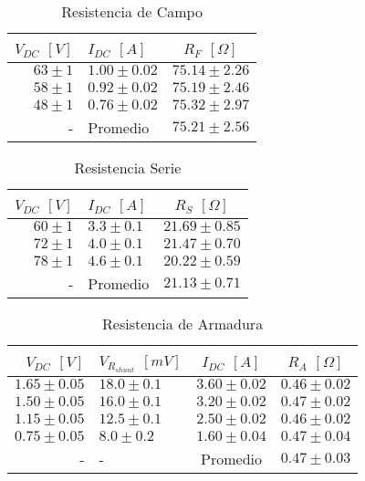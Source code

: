 \documentclass[11pt,letterpaper]{article}
\begin{document}
\begin{table}[t]
	\begin{center}
		\begin{tabular}{| r | l | c |}
			\hline
			$V_{DC}$ $[V]$ & $I_{DC}$ $[A]$ & $R_{F}$ $[\Omega]$ \\ \hline
			$63 \pm 1$ & $1.00 \pm 0.02$ & $75.14 \pm 2.26 $ \\
			$58 \pm 1$ & $0.92 \pm 0.02$ & $75.19 \pm 2.46$ \\
			$48 \pm 1$ & $0.76 \pm 0.02$ & $75.32 \pm 2.97$ \\ \hline
			- & Promedio & $75.21 \pm 2.56$ \\ \hline
		\end{tabular}
		\caption{Resistencia de Campo}
		\label{tab:resistencia de campo}
	\end{center}
\end{table}

\begin{table}[t]
	\begin{center}
		\begin{tabular}{| r | l | c |}
			\hline
			$V_{DC}$ $[V]$ & $I_{DC}$ $[A]$ & $R_{S}$ $[\Omega]$ \\ \hline
			$60 \pm 1$ & $3.3 \pm 0.1$ & $21.69 \pm 0.85$ \\
			$72 \pm 1$ & $4.0 \pm 0.1$ & $21.47 \pm 0.70$ \\
			$78 \pm 1$ & $4.6 \pm 0.1$ & $20.22 \pm 0.59$ \\  \hline
			- & Promedio & $21.13 \pm 0.71$ \\ \hline
		\end{tabular}
		\caption{Resistencia Serie}
		\label{tab:resistencia serie}
	\end{center}
\end{table}

\begin{table}[t]
	\begin{center}
		\begin{tabular}{| r | l | c | c |}
			\hline
			$V_{DC}$ $[V]$ & $V_{R_{shunt}}$ $[mV]$ & $I_{DC}$ $[A]$ & $R_{A}$ $[\Omega]$ \\ \hline
			$1.65 \pm 0.05$ & $18.0 \pm 0.1$ & $3.60 \pm 0.02$ & $0.46 \pm 0.02$ \\
			$1.50 \pm 0.05$ & $16.0 \pm 0.1$ & $3.20 \pm 0.02$ & $0.47 \pm 0.02$ \\
			$1.15 \pm 0.05$ & $12.5 \pm 0.1$ & $2.50 \pm 0.02$ & $0.46 \pm 0.02$ \\  
			$0.75 \pm 0.05$ & $8.0 \pm 0.2$  & $1.60 \pm 0.04$ & $0.47 \pm 0.04$ \\  \hline
			- & - & Promedio & $0.47 \pm 0.03$ \\ \hline
		\end{tabular}
		\caption{Resistencia de Armadura}
		\label{tab:resistencia de Armadura}
	\end{center}
\end{table}
\end{document}
